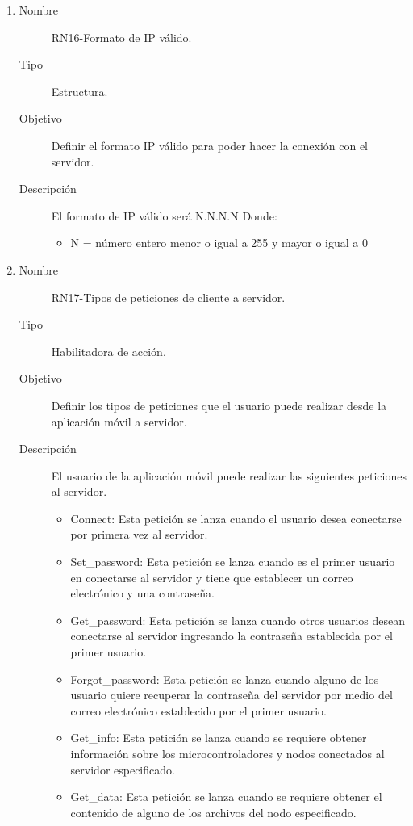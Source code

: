 \begin{enumerate}[label=RN\arabic*.]
\item \label{RN16}
		\begin{description}
			\item[Nombre] RN16-Formato de IP válido.
			\item[Tipo] Estructura.
			\item[Objetivo] Definir el formato IP válido para poder hacer la conexión con el servidor.
			\item[Descripción] El formato de IP válido será N.N.N.N
			Donde:
			\begin{itemize}
		 		\item N = número entero menor o igual a 255 y mayor o igual a 0
		    \end{itemize}
		\end{description}

\item \label{RN17}
		\begin{description}
			\item[Nombre] RN17-Tipos de peticiones de cliente a servidor.
			\item[Tipo] Habilitadora de acción.
			\item[Objetivo] Definir los tipos de peticiones que el usuario puede realizar desde la aplicación móvil a servidor.
			\item[Descripción] El usuario de la aplicación móvil puede realizar las siguientes peticiones al servidor.
			\begin{itemize}
		 		\item Connect: Esta petición se lanza cuando el usuario desea conectarse por primera vez al servidor.
		 		\item Set\_password: Esta petición se lanza cuando es el primer usuario en conectarse al servidor y tiene que establecer un correo electrónico y una contraseña.
		 		\item Get\_password: Esta petición se lanza cuando otros usuarios desean conectarse al servidor ingresando la contraseña establecida por el primer usuario.
		 		\item Forgot\_password: Esta petición se lanza cuando alguno de los usuario quiere recuperar la contraseña del servidor por medio del correo electrónico establecido por el primer usuario.
		 		\item Get\_info: Esta petición se lanza cuando se requiere obtener información sobre los microcontroladores y nodos conectados al servidor especificado.
		 		\item Get\_data: Esta petición se lanza cuando se requiere obtener el contenido de alguno de los archivos del nodo especificado.
		    \end{itemize}
		\end{description}



\end{enumerate}
